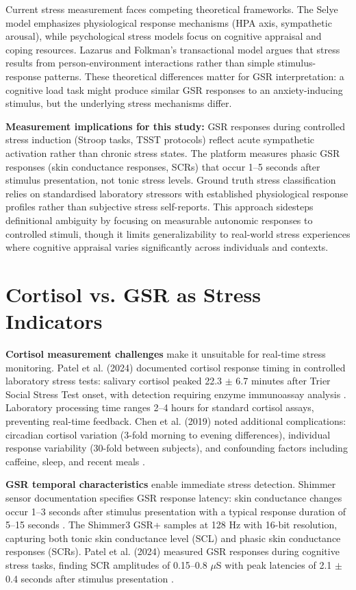 Current stress measurement faces competing theoretical frameworks. The Selye model emphasizes physiological response mechanisms (HPA axis, sympathetic arousal), while psychological stress models focus on cognitive appraisal and coping resources. Lazarus and Folkman's transactional model argues that stress results from person-environment interactions rather than simple stimulus-response patterns. These theoretical differences matter for GSR interpretation: a cognitive load task might produce similar GSR responses to an anxiety-inducing stimulus, but the underlying stress mechanisms differ.

\textbf{Measurement implications for this study:} GSR responses during controlled stress induction (Stroop tasks, TSST protocols) reflect acute sympathetic activation rather than chronic stress states. The platform measures phasic GSR responses (skin conductance responses, SCRs) that occur 1--5 seconds after stimulus presentation, not tonic stress levels. Ground truth stress classification relies on standardised laboratory stressors with established physiological response profiles rather than subjective stress self-reports. This approach sidesteps definitional ambiguity by focusing on measurable autonomic responses to controlled stimuli, though it limits generalizability to real-world stress experiences where cognitive appraisal varies significantly across individuals and contexts.


\section{Cortisol vs. GSR as Stress Indicators}
\textbf{Cortisol measurement challenges} make it unsuitable for real-time stress monitoring. Patel et al. (2024) documented cortisol response timing in controlled laboratory stress tests: salivary cortisol peaked 22.3 $\pm$ 6.7 minutes after Trier Social Stress Test onset, with detection requiring enzyme immunoassay analysis \cite{ref7}. Laboratory processing time ranges 2--4 hours for standard cortisol assays, preventing real-time feedback. Chen et al. (2019) noted additional complications: circadian cortisol variation (3-fold morning to evening differences), individual response variability (30-fold between subjects), and confounding factors including caffeine, sleep, and recent meals \cite{ref4}.

\textbf{GSR temporal characteristics} enable immediate stress detection. Shimmer sensor documentation specifies GSR response latency: skin conductance changes occur 1--3 seconds after stimulus presentation with a typical response duration of 5--15 seconds \cite{ref8}. The Shimmer3 GSR+ samples at 128 Hz with 16-bit resolution, capturing both tonic skin conductance level (SCL) and phasic skin conductance responses (SCRs). Patel et al. (2024) measured GSR responses during cognitive stress tasks, finding SCR amplitudes of 0.15--0.8 $\mu$S with peak latencies of 2.1 $\pm$ 0.4 seconds after stimulus presentation \cite{ref7}.

